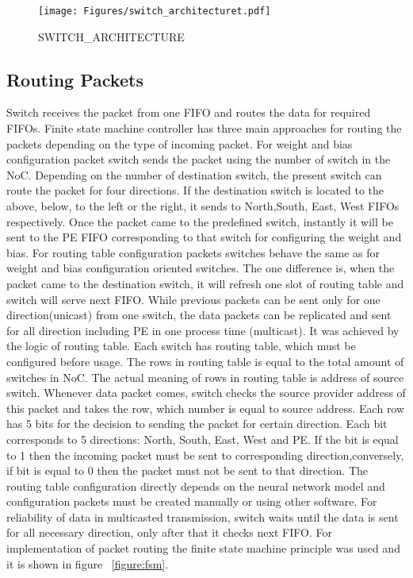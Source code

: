 \begin{figure}
    \texttt{[image: Figures/switch\_architecturet.pdf]}
    \caption{SWITCH_ARCHITECTURE} 
    \label{figure:switch_architecture}
\end{figure}
\subsection{Routing Packets}
Switch receives the packet from one FIFO and routes the data for required FIFOs. Finite state machine controller has three main approaches for routing the packets depending on the type of incoming packet.
 For weight and bias configuration packet switch sends the packet using the number of switch in the NoC. Depending on the number of destination switch, the present switch can route the packet for four directions. If the destination switch is located to the above, below, to the left or the right, it sends to North,South, East, West FIFOs respectively. Once the packet came to the predefined switch, instantly it will be sent to the PE FIFO corresponding to that switch for configuring the weight and bias.   
For routing table configuration packets switches behave the same as for weight and bias configuration oriented switches. The one difference is, when the packet came to the destination switch, it will refresh one slot of routing table and switch will serve next FIFO. 
	While previous packets can be sent only for one direction(unicast) from one switch, the data packets can be replicated and sent for all direction including PE in one process time (multicast). It was achieved by the logic of routing table. Each switch has routing table, which must be configured before usage. The rows in routing table is equal to the total amount of switches in NoC. The actual meaning of rows in routing table is address of source switch. Whenever data packet comes, switch checks the source provider address of this packet and takes the row, which number is equal to source address. Each row has 5 bits for the decision to sending the packet for certain direction.  Each bit corresponds to 5 directions: North, South, East, West and PE. If the bit is equal to 1 then the incoming packet must be sent to corresponding direction,conversely, if bit is equal to 0 then the packet must not be sent to that direction. The routing table configuration directly depends on the neural network model and configuration packets must be created manually or using other software. For reliability of data in multicasted transmission, switch waits until the data is sent for all necessary direction, only after that it checks next FIFO. For implementation of packet routing the finite state machine principle was used and it is shown in figure ~\ref{figure:fsm}.


